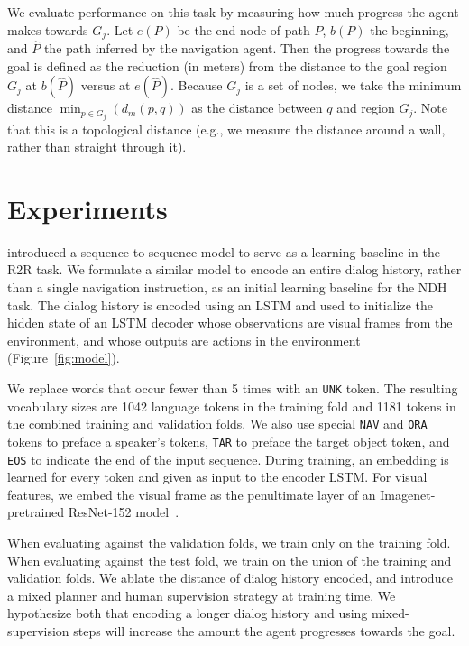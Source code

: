 \documentclass{article}
\newcommand{\task}{NDH}
\begin{document}
We evaluate performance on this task by measuring how much progress the agent makes towards $G_j$.
Let $e(P)$ be the end node of path $P$, $b(P)$ the beginning, and $\hat{P}$ the path inferred by the navigation agent.
Then the progress towards the goal is defined as the reduction (in meters) from the distance to the goal region $G_j$ at $b(\hat{P})$ versus at $e(\hat{P})$.
Because $G_j$ is a set of nodes, we take the minimum distance $\min_{p\in G_j}(d_m(p, q))$ as the distance between $q$ and region $G_j$.
Note that this is a topological distance (e.g., we measure the distance around a wall, rather than straight through it).
 
\section{Experiments}
\label{sec:experiments}

\citet{anderson:cvpr18} introduced a sequence-to-sequence model to serve as a learning baseline in the R2R task.
We formulate a similar model to encode an entire dialog history, rather than a single navigation instruction, as an initial learning baseline for the \task{} task.
The dialog history is encoded using an LSTM and used to initialize the hidden state of an LSTM decoder whose observations are visual frames from the environment, and whose outputs are actions in the environment (Figure~\ref{fig:model}).

We replace words that occur fewer than 5 times with an \texttt{UNK} token.
The resulting vocabulary sizes are 1042 language tokens in the training fold and 1181 tokens in the combined training and validation folds.
We also use special \texttt{NAV} and \texttt{ORA} tokens to preface a speaker's tokens, \texttt{TAR} to preface the target object token, and \texttt{EOS} to indicate the end of the input sequence.
During training, an embedding is learned for every token and given as input to the encoder LSTM.
For visual features, we embed the visual frame as the penultimate layer of an Imagenet-pretrained ResNet-152 model~\cite{he:cvpr16}.

When evaluating against the validation folds, we train only on the training fold.
When evaluating against the test fold, we train on the union of the training and validation folds.
We ablate the distance of dialog history encoded, and introduce a mixed planner and human supervision strategy at training time.
We hypothesize both that encoding a longer dialog history and using mixed-supervision steps will increase the amount the agent progresses towards the goal.
\end{document}
